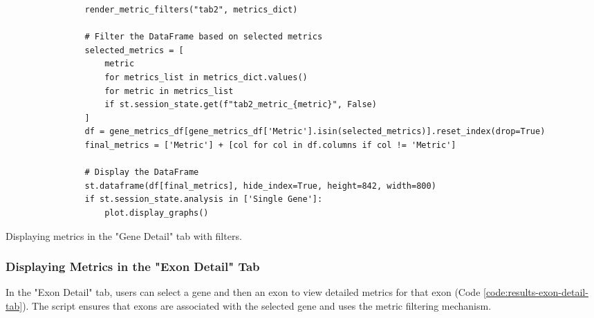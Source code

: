 \begin{longlisting}
\begin{verbatim}
                render_metric_filters("tab2", metrics_dict)

                # Filter the DataFrame based on selected metrics
                selected_metrics = [
                    metric
                    for metrics_list in metrics_dict.values()
                    for metric in metrics_list
                    if st.session_state.get(f"tab2_metric_{metric}", False)
                ]
                df = gene_metrics_df[gene_metrics_df['Metric'].isin(selected_metrics)].reset_index(drop=True)
                final_metrics = ['Metric'] + [col for col in df.columns if col != 'Metric']

                # Display the DataFrame
                st.dataframe(df[final_metrics], hide_index=True, height=842, width=800)
                if st.session_state.analysis in ['Single Gene']:
                    plot.display_graphs()
\end{verbatim}
\caption{Displaying metrics in the "Gene Detail" tab with filters.}
\label{code:results-gene-detail-tab}
\end{longlisting}

\subsubsection{\textbf{Displaying Metrics in the "Exon Detail" Tab}}

In the "Exon Detail" tab, users can select a gene and then an exon to view detailed metrics for that exon (Code \ref{code:results-exon-detail-tab}). The script ensures that exons are associated with the selected gene and uses the metric filtering mechanism.

